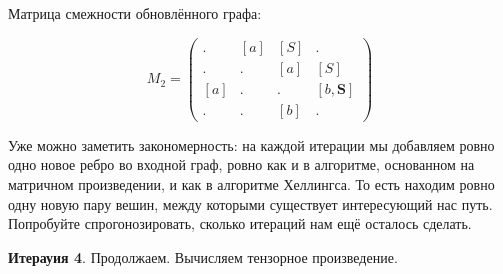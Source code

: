 \begin{example}
Матрица смежности обновлённого графа:

$$ M_2 =
\begin{pmatrix}
. & [a] & [S] & . \\
. & . & [a] & [S] \\
[a] & . & . & [b, \textbf{S}] \\
. & . & [b] & .
\end{pmatrix}
$$

Уже можно заметить закономерность: на каждой итерации мы добавляем ровно одно новое ребро во входной граф, ровно как и в алгоритме, основанном на матричном произведении, и как в алгоритме Хеллингса.
То есть находим ровно одну новую пару вешин, между которыми существует интересующий нас путь.
Попробуйте спрогонозировать, сколько итераций нам ещё осталось сделать.

\textbf{Итерауия 4}.
Продолжаем. Вычисляем тензорное произведение.


\end{example}
